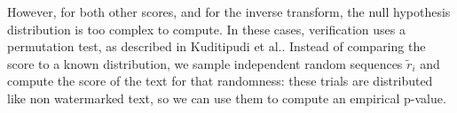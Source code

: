 However, for both other scores, and for the inverse transform, the null hypothesis distribution is too complex to compute. In these cases, verification uses a permutation test, as described in Kuditipudi et al.. Instead of comparing the score to a known distribution, we sample independent random sequences $\tilde{r}_i$ and compute the score of the text for that randomness: these trials are distributed like non watermarked text, so we can use them to compute an empirical p-value. 